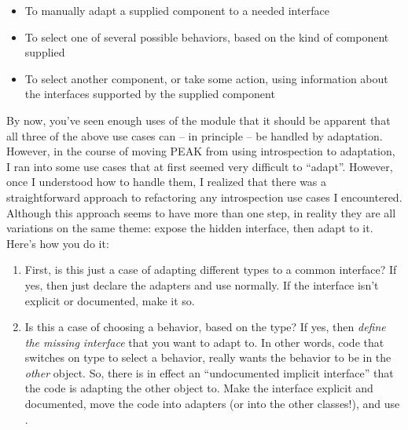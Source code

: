 \begin{verbatim%
}
\begin{verbatim%
}
\begin{verbatim%
}
\begin{verbatim%
}
\begin{verbatim%
}
\begin{verbatim%
}
\begin{verbatim%
}
\begin{verbatim%
}
\begin{verbatim%
}
\begin{verbatim%
}
\begin{verbatim%
}
\begin{verbatim%
}
\begin{verbatim%
}
\begin{verbatim%
}
\begin{itemize}
\item To manually adapt a supplied component to a needed interface

\item To select one of several possible behaviors, based on the kind of
component supplied

\item To select another component, or take some action, using information
about the interfaces supported by the supplied component

\end{itemize}

By now, you've seen enough uses of the  module that it should
be apparent that all three of the above use cases can -- in principle -- be
handled by adaptation.  However, in the course of moving PEAK from using
introspection to adaptation, I ran into some use cases that at first seemed
very difficult to ``adapt''.  However, once I understood how to handle them,
I realized that there was a straightforward approach to refactoring any
introspection use cases I encountered.  Although this approach seems to have
more than one step, in reality they are all variations on the same theme: expose
the hidden interface, then adapt to it.  Here's how you do it:

\begin{enumerate}
\item First, is this just a case of adapting different types to a common
interface?  If yes, then just declare the adapters and use 
normally.  If the interface isn't explicit or documented, make it so.

\item Is this a case of choosing a behavior, based on the type?  If yes, then
\emph{define the missing interface} that you want to adapt to.  In other words,
code that switches on type to select a behavior, really wants the behavior to be
in the \emph{other} object.  So, there is in effect an ``undocumented implicit
interface'' that the code is adapting the other object to.  Make the interface
explicit and documented, move the code into adapters (or into the other
classes!), and use .


\end{enumerate}
\end{verbatim%
}
\end{verbatim%
}
\end{verbatim%
}
\end{verbatim%
}
\end{verbatim%
}
\end{verbatim%
}
\end{verbatim%
}
\end{verbatim%
}
\end{verbatim%
}
\end{verbatim%
}
\end{verbatim%
}
\end{verbatim%
}
\end{verbatim%
}
\end{verbatim%
}
